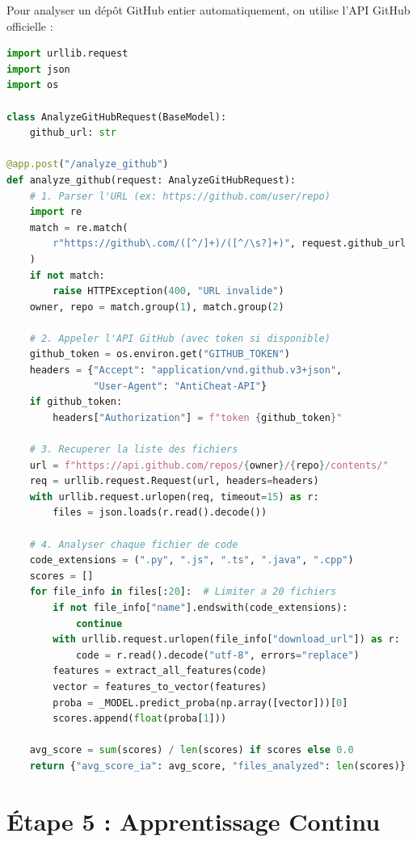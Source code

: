 \documentclass[a4paper,11pt]{article}
\begin{document}
Pour analyser un dépôt GitHub entier automatiquement, on utilise l'API GitHub officielle :

\begin{lstlisting}[language=Python, caption=Ajouter la route d'analyse GitHub dans api.py]
import urllib.request
import json
import os

class AnalyzeGitHubRequest(BaseModel):
    github_url: str

@app.post("/analyze_github")
def analyze_github(request: AnalyzeGitHubRequest):
    # 1. Parser l'URL (ex: https://github.com/user/repo)
    import re
    match = re.match(
        r"https://github\.com/([^/]+)/([^/\s?]+)", request.github_url
    )
    if not match:
        raise HTTPException(400, "URL invalide")
    owner, repo = match.group(1), match.group(2)
    
    # 2. Appeler l'API GitHub (avec token si disponible)
    github_token = os.environ.get("GITHUB_TOKEN")
    headers = {"Accept": "application/vnd.github.v3+json",
               "User-Agent": "AntiCheat-API"}
    if github_token:
        headers["Authorization"] = f"token {github_token}"
    
    # 3. Recuperer la liste des fichiers
    url = f"https://api.github.com/repos/{owner}/{repo}/contents/"
    req = urllib.request.Request(url, headers=headers)
    with urllib.request.urlopen(req, timeout=15) as r:
        files = json.loads(r.read().decode())
    
    # 4. Analyser chaque fichier de code
    code_extensions = (".py", ".js", ".ts", ".java", ".cpp")
    scores = []
    for file_info in files[:20]:  # Limiter a 20 fichiers
        if not file_info["name"].endswith(code_extensions):
            continue
        with urllib.request.urlopen(file_info["download_url"]) as r:
            code = r.read().decode("utf-8", errors="replace")
        features = extract_all_features(code)
        vector = features_to_vector(features)
        proba = _MODEL.predict_proba(np.array([vector]))[0]
        scores.append(float(proba[1]))
    
    avg_score = sum(scores) / len(scores) if scores else 0.0
    return {"avg_score_ia": avg_score, "files_analyzed": len(scores)}
\end{lstlisting}


\section{Étape 5 : Apprentissage Continu}
\end{document}
